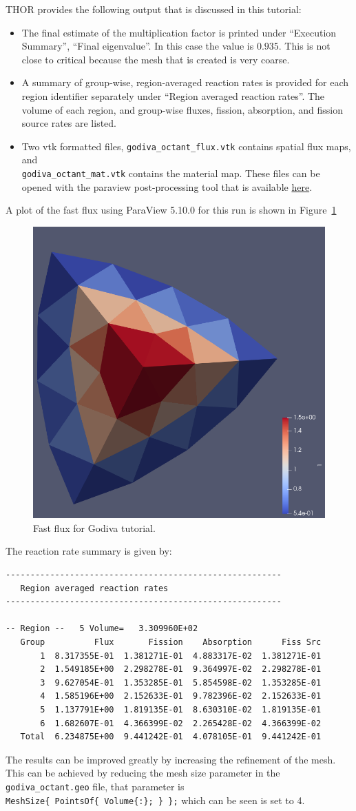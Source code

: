 THOR provides the following output that is discussed in this tutorial:
\begin{itemize}
    \item The final estimate of the multiplication factor is printed under ``Execution Summary'', ``Final eigenvalue''.
    In this case the value is $0.935$. This is not close to critical because the mesh that
    is created is very coarse.
    \item A summary of group-wise, region-averaged reaction rates is provided for each region identifier separately under ``Region averaged reaction rates''.
    The volume of each region, and group-wise fluxes, fission, absorption, and fission source rates are listed.
    \item Two vtk formatted files, \verb"godiva_octant_flux.vtk" contains spatial flux maps, and \\
    \verb"godiva_octant_mat.vtk" contains the material map. These files can be opened with the paraview post-processing tool that is available \href{https://www.paraview.org/download/}{here}.
\end{itemize}

A plot of the fast flux using ParaView 5.10.0 for this run is shown in Figure~\ref{fig:godiva_fast}
\begin{figure}[th]
  \center
  \includegraphics[height=0.5\textwidth]{chapters/tutorials/figures/godiva_fast.png}
  \caption{Fast flux for Godiva tutorial.}
  \label{fig:godiva_fast}
\end{figure}

The reaction rate summary is given by:
\begin{verbatim}
--------------------------------------------------------
   Region averaged reaction rates
--------------------------------------------------------

-- Region --   5 Volume=   3.309960E+02
   Group          Flux       Fission    Absorption      Fiss Src
       1  8.317355E-01  1.381271E-01  4.883317E-02  1.381271E-01
       2  1.549185E+00  2.298278E-01  9.364997E-02  2.298278E-01
       3  9.627054E-01  1.353285E-01  5.854598E-02  1.353285E-01
       4  1.585196E+00  2.152633E-01  9.782396E-02  2.152633E-01
       5  1.137791E+00  1.819135E-01  8.630310E-02  1.819135E-01
       6  1.682607E-01  4.366399E-02  2.265428E-02  4.366399E-02
   Total  6.234875E+00  9.441242E-01  4.078105E-01  9.441242E-01
\end{verbatim}

The results can be improved greatly by increasing the refinement of the mesh.
This can be achieved by reducing the mesh size parameter in the \verb"godiva_octant.geo" file, that parameter is \\
\verb"MeshSize{ PointsOf{ Volume{:}; } };" which can be seen is set to 4.